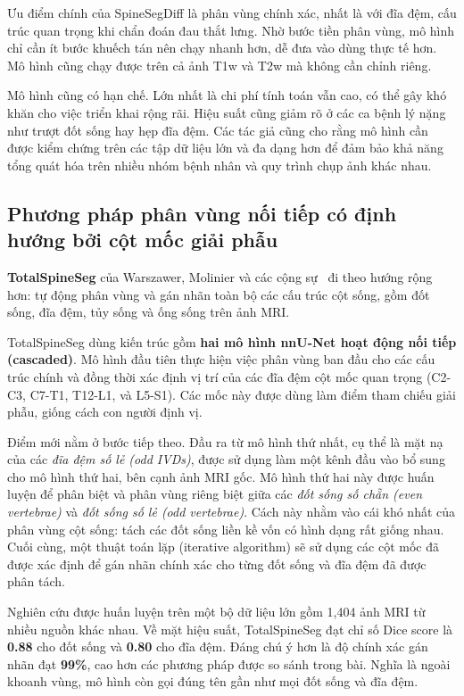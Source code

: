 Ưu điểm chính của SpineSegDiff là phân vùng chính xác, nhất là với đĩa đệm, cấu trúc quan trọng khi chẩn đoán đau thắt lưng. Nhờ bước tiền phân vùng, mô hình chỉ cần ít bước khuếch tán nên chạy nhanh hơn, dễ đưa vào dùng thực tế hơn. Mô hình cũng chạy được trên cả ảnh T1w và T2w mà không cần chỉnh riêng.

Mô hình cũng có hạn chế. Lớn nhất là chi phí tính toán vẫn cao, có thể gây khó khăn cho việc triển khai rộng rãi. Hiệu suất cũng giảm rõ ở các ca bệnh lý nặng như trượt đốt sống hay hẹp đĩa đệm. Các tác giả cũng cho rằng mô hình cần được kiểm chứng trên các tập dữ liệu lớn và đa dạng hơn để đảm bảo khả năng tổng quát hóa trên nhiều nhóm bệnh nhân và quy trình chụp ảnh khác nhau.
\subsection{Phương pháp phân vùng nối tiếp có định hướng bởi cột mốc giải phẫu}
\textbf{TotalSpineSeg} của Warszawer, Molinier và các cộng sự~\cite{warszawer2025totalspineseg} đi theo hướng rộng hơn: tự động phân vùng và gán nhãn toàn bộ các cấu trúc cột sống, gồm đốt sống, đĩa đệm, tủy sống và ống sống trên ảnh MRI.

TotalSpineSeg dùng kiến trúc gồm \textbf{hai mô hình nnU-Net hoạt động nối tiếp (cascaded)}. Mô hình đầu tiên thực hiện việc phân vùng ban đầu cho các cấu trúc chính và đồng thời xác định vị trí của các đĩa đệm cột mốc quan trọng (C2-C3, C7-T1, T12-L1, và L5-S1). Các mốc này được dùng làm điểm tham chiếu giải phẫu, giống cách con người định vị.

Điểm mới nằm ở bước tiếp theo. Đầu ra từ mô hình thứ nhất, cụ thể là mặt nạ của các \textit{đĩa đệm số lẻ (odd IVDs)}, được sử dụng làm một kênh đầu vào bổ sung cho mô hình thứ hai, bên cạnh ảnh MRI gốc. Mô hình thứ hai này được huấn luyện để phân biệt và phân vùng riêng biệt giữa các \textit{đốt sống số chẵn (even vertebrae)} và \textit{đốt sống số lẻ (odd vertebrae)}. Cách này nhằm vào cái khó nhất của phân vùng cột sống: tách các đốt sống liền kề vốn có hình dạng rất giống nhau. Cuối cùng, một thuật toán lặp (iterative algorithm) sẽ sử dụng các cột mốc đã được xác định để gán nhãn chính xác cho từng đốt sống và đĩa đệm đã được phân tách.

Nghiên cứu được huấn luyện trên một bộ dữ liệu lớn gồm 1,404 ảnh MRI từ nhiều nguồn khác nhau. Về mặt hiệu suất, TotalSpineSeg đạt chỉ số Dice score là \textbf{0.88} cho đốt sống và \textbf{0.80} cho đĩa đệm. Đáng chú ý hơn là độ chính xác gán nhãn đạt \textbf{99\%}, cao hơn các phương pháp được so sánh trong bài. Nghĩa là ngoài khoanh vùng, mô hình còn gọi đúng tên gần như mọi đốt sống và đĩa đệm.

